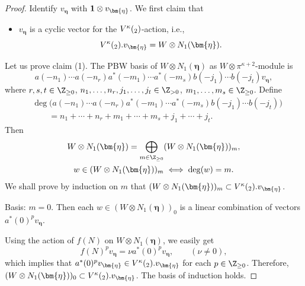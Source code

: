 \documentclass[10pt,a4paper]{amsart}
\numberwithin{equation}{section}
\theoremstyle{definition}
\newcommand{\1}{\textbf{1}}
\begin{document}
\begin{proof}
Identify $v_{\bm{\eta}}$ with $ {\bf 1} \otimes v_{\bm{\eta}}$.
We first claim that
\begin{itemize}\itemsep=0pt
\item[(1)] $v_{\bm{\eta}}$ is a cyclic vector for the $V^{\kappa}(\sl_2)$-action, i.e.,
 \[ V^{\kappa}(\sl_2). v_{\bm{\eta}} = W \otimes N_1(\bm{\eta}). \]
\end{itemize}
Let us prove claim (1). The PBW basis of $W \otimes N_1(\bm{\eta})$ as $W \otimes \pi^{\kappa +2}$-module is
\[ a(-n_1) \cdots a(-n_r) a^*(-m_1) \cdots a^* (-m_s) b(-j_1) \cdots b(-j_t) v_{\bm{\eta}}, \]
where $r,s,t \in {\Z}_{\ge 0}$, $n_1, \dots, n_r, j_1,\dots, j_t \in {\Z}_{>0}$, $m_1, \dots, m_s \in {\Z}_{\ge 0}$.
Define
\[
\begin{aligned}
&\deg\bigl(a(-n_1)\cdots a(-n_r)a^*(-m_1)\cdots a^*(-m_s)
 b(-j_1)\cdots b(-j_t)\bigr)\\
&\qquad = n_1+\cdots+n_r+m_1+\cdots+m_s+j_1+\cdots+j_t.
\end{aligned}
\]
Then
\begin{gather*}
 W \otimes N_1(\bm{\eta}) = \bigoplus_{m \in {\Z}_{\ge 0} } ( W \otimes N_1(\bm{\eta}) )_m, \\
w \in ( W \otimes N_1(\bm{\eta}) )_m \iff \deg (w) = m.
\end{gather*}
We shall prove by induction on $m$ that $( W \otimes N_1(\bm{\eta}) )_m \subset V^{\kappa}(\sl_2). v_{\bm{\eta}}$.

Basis: $m = 0$.
Then each $w \in ( W \otimes N_1(\bm{\eta}) )_0$ is a linear combination of vectors
$a^*(0) ^p v_{\bm{\eta}}$.


Using the action of $f(N)$ on $W \otimes N_1(\bm{\eta})$, we easily get \[ f(N) ^p v_{\bm{\eta}} = \nu a^*(0) ^p v_{\bm{\eta}}, \qquad (\nu \ne 0), \]
which implies that $a^*(0) ^p v_{\bm{\eta}} \in V^{\kappa}(\sl_2). v_{\bm{\eta}}$ for each $p \in {\Z}_{\ge 0}$. Therefore,
$( W \otimes N_1(\bm{\eta}) )_0 \subset V^{\kappa}(\sl_2). v_{\bm{\eta}}$. The basis of induction holds.


\end{proof}
\end{document}
